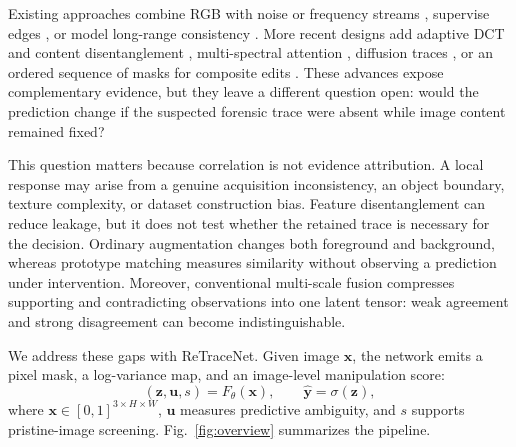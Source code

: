 \documentclass[journal]{IEEEtran}
\newcommand{\method}{ReTraceNet}
\begin{document}
Existing approaches combine RGB with noise or frequency streams
\cite{zhou2018learning,wu2019mantranet,kwon2021catnet,guillaro2023trufor}, supervise
edges \cite{chen2021mvss,li2023edge}, or model long-range consistency
\cite{wang2022objectformer,guo2023hifi}. More recent designs add adaptive DCT and
content disentanglement \cite{wong2025adcd}, multi-spectral attention
\cite{nam2025m2sformer}, diffusion traces \cite{yu2024diffforensics}, or an ordered
sequence of masks for composite edits \cite{zhu2026rita}. These advances expose
complementary evidence, but they leave a different question open: would the
prediction change if the suspected forensic trace were absent while image content
remained fixed?

This question matters because correlation is not evidence attribution. A local
response may arise from a genuine acquisition inconsistency, an object boundary,
texture complexity, or dataset construction bias. Feature disentanglement can
reduce leakage, but it does not test whether the retained trace is necessary for
the decision. Ordinary augmentation changes both foreground and background,
whereas prototype matching measures similarity without observing a prediction
under intervention. Moreover, conventional multi-scale fusion compresses
supporting and contradicting observations into one latent tensor: weak agreement
and strong disagreement can become indistinguishable.

We address these gaps with \method. Given image $\mathbf{x}$, the network emits a
pixel mask, a log-variance map, and an image-level manipulation score:
\begin{equation}
(\mathbf{z},\mathbf{u},s)=F_{\theta}(\mathbf{x}),\qquad
\hat{\mathbf y}=\sigma(\mathbf z),
\label{eq:problem}
\end{equation}
where $\mathbf{x}\in[0,1]^{3\times H\times W}$, $\mathbf{u}$ measures predictive
ambiguity, and $s$ supports pristine-image screening.  Fig.~\ref{fig:overview}
summarizes the pipeline.
\end{document}
